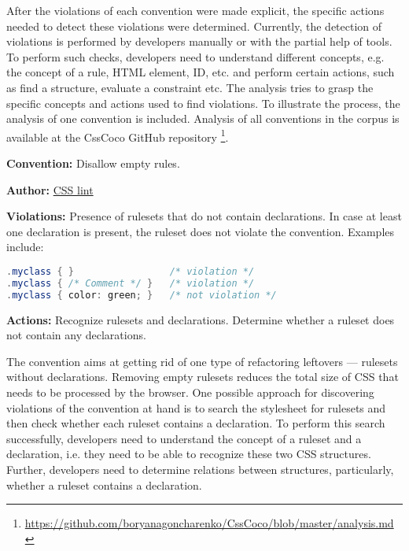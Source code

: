 After the violations of each convention were made explicit, the specific actions needed to detect
these violations were determined. Currently, the detection of violations is performed by developers
manually or with the partial help of tools. To perform such checks, developers need to understand
different concepts, e.g. the concept of a rule, HTML element, ID, etc. and perform certain actions,
such as find a structure, evaluate a constraint etc. The analysis tries to grasp the specific
concepts and actions used to find violations. To illustrate the process, the analysis of one convention is included. Analysis of all conventions in the corpus is available at the CssCoco GitHub repository
\footnote{\url{https://github.com/boryanagoncharenko/CssCoco/blob/master/analysis.md}}.

\bigskip
\begin{boxedminipage}{.95\textwidth}
\begin{description}
\item\textbf{Convention:} Disallow empty rules.
\item\textbf{Author:} \href{https://github.com/CSSLint/csslint/wiki/Disallow-empty-rules}{CSS lint}
\item\textbf{Violations:} Presence of rulesets that do not contain declarations. In case at least one declaration is present, the ruleset does not violate the convention. Examples include:

\begin{lstlisting}[style=mono,language=Java]
.myclass { }                 /* violation */
.myclass { /* Comment */ }   /* violation */
.myclass { color: green; }   /* not violation */
\end{lstlisting}

\item\textbf{Actions:} Recognize rulesets and declarations. Determine whether a ruleset does not contain any declarations.
\end{description}
\end{boxedminipage}
\bigskip

The convention aims at getting rid of one type of refactoring leftovers ---
rulesets without declarations. Removing empty rulesets reduces the total size of CSS that
needs to be processed by the browser. One possible approach for discovering violations of the
convention at hand is to search the stylesheet for rulesets and then check whether each ruleset
contains a declaration. To perform this search successfully, developers need to understand the
concept of a ruleset and a declaration, i.e. they need to be able to recognize these two CSS
structures. Further, developers need to determine relations between structures, particularly,
whether a ruleset contains a declaration.

